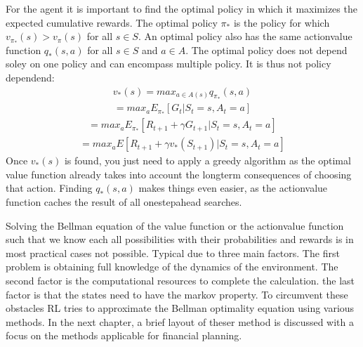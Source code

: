 \documentclass[letterpaper,10pt,english]{jupyterBook}
\begin{document}
\sphinxAtStartPar
For the agent it is important to find the optimal policy in which it maximizes the expected cumulative rewards. The optimal policy \(\pi_*\) is the policy for which \(v_{\pi_*}(s) > v_{\pi}(s)\) for all \(s \in S\). An optimal policy also has the same action\sphinxhyphen{}value function \(q_*(s,a)\) for all \(s \in S\) and \(a \in A\). The optimal policy does not depend soley on one policy and can encompass multiple policy. It is thus not policy dependend:
\begin{equation*}
\begin{split} v_*(s) = max_{a \in A(s)} q_{\pi_*}(s,a) \end{split}
\end{equation*}\begin{equation*}
\begin{split} = max_{a} E_{\pi_*}[G_t | S_t=s, A_t=a] \end{split}
\end{equation*}\begin{equation*}
\begin{split} = max_{a} E_{\pi_*}[R_{t+1} + \gamma G_{t+1} | S_t=s, A_t=a] \end{split}
\end{equation*}\begin{equation*}
\begin{split} = max_{a} E[R_{t+1} + \gamma v_*(S_{t+1}) | S_t=s, A_t=a] \end{split}
\end{equation*}
\sphinxAtStartPar
Once \(v_*(s)\) is found, you just need to apply a greedy algorithm as the optimal value function already takes into account the long\sphinxhyphen{}term consequences of choosing that action. Finding \(q_*(s,a)\) makes things even easier, as the action\sphinxhyphen{}value function caches the result of all one\sphinxhyphen{}step\sphinxhyphen{}ahead searches.

\sphinxAtStartPar
Solving the Bellman equation of the value function or the action\sphinxhyphen{}value function such that we know each all possibilities with their probabilities and rewards is in most practical cases not possible. Typical due to three main factors. The first problem is obtaining full knowledge of the dynamics of the environment. The second factor is the computational resources to complete the calculation. the last factor is that the states need to have the markov property.   To circumvent these obstacles RL tries to approximate the Bellman optimality equation using various methods. In the next chapter, a brief layout of theser method is discussed with a focus on the methods applicable for financial planning.
\end{document}
